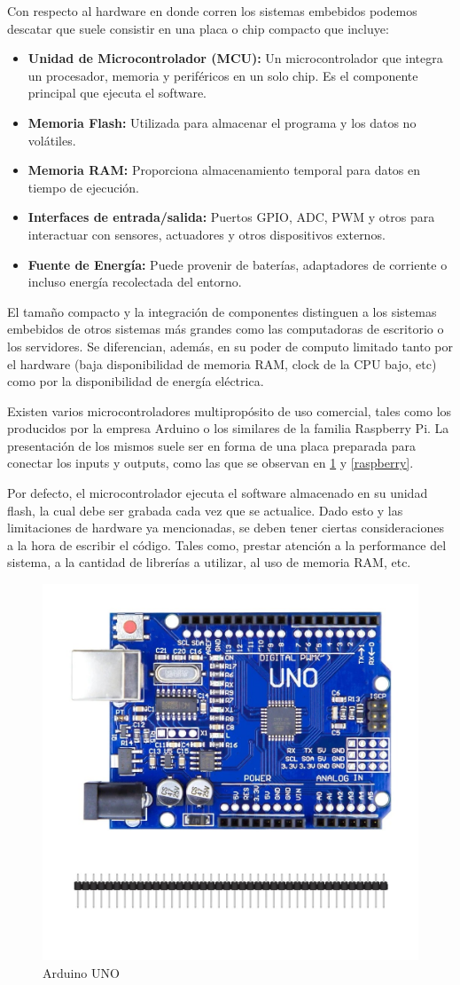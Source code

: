 Con respecto al hardware en donde corren los sistemas embebidos podemos descatar que suele consistir en una placa o chip compacto que incluye:
\begin{itemize}
    \item \textbf{Unidad de Microcontrolador (MCU):} Un microcontrolador que integra un procesador, memoria y perif\'ericos en un solo chip. Es el componente principal que ejecuta el software.
    \item \textbf{Memoria Flash:} Utilizada para almacenar el programa y los datos no vol\'atiles.
    \item \textbf{Memoria RAM:} Proporciona almacenamiento temporal para datos en tiempo de ejecuci\'on.
    \item \textbf{Interfaces de entrada/salida:} Puertos \gls{GPIO}, \gls{ADC}, \gls{PWM} y otros para interactuar con sensores, actuadores y otros dispositivos externos.
    \item \textbf{Fuente de Energ\'ia:} Puede provenir de bater\'ias, adaptadores de corriente o incluso energ\'ia recolectada del entorno.
\end{itemize}
El tama\~no compacto y la integraci\'on de componentes distinguen a los sistemas embebidos de otros sistemas m\'as grandes como las computadoras de escritorio o los servidores. Se diferencian, además, en su poder de computo limitado tanto por el hardware (baja disponibilidad de memoria RAM, \gls{clock} de la CPU bajo, etc) como por la disponibilidad de energía eléctrica.

Existen varios microcontroladores multipropósito de uso comercial, tales como los producidos por la empresa Arduino o los similares de la familia  Raspberry Pi. La presentación de los mismos suele ser en forma de una placa preparada para conectar los inputs y outputs, como las que se observan en \ref{arduinoUNO} y \ref{raspberry}.

Por defecto, el microcontrolador ejecuta el software almacenado en su unidad flash, la cual debe ser grabada cada vez que se actualice. Dado esto y las limitaciones de hardware ya mencionadas, se deben tener ciertas consideraciones a la hora de escribir el código. Tales como, prestar atención a la performance del sistema, a la cantidad de librerías a utilizar, al uso de memoria RAM, etc.

\begin{figure}[h!]
	\caption{Arduino UNO}
	\label{arduinoUNO}
	\centering
    \includegraphics[width=0.5\linewidth]{arduinoUNO.jpeg}
\end{figure}



